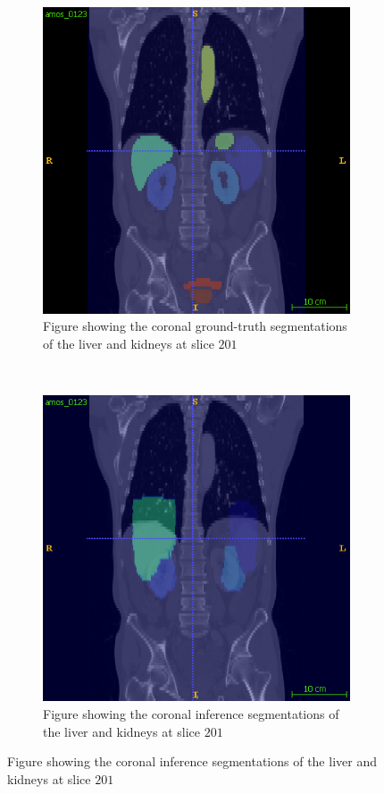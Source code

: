 \documentclass{l4proj}
\begin{document}
\begin{figure}[htb]
    \begin{subfigure}[b]{0.45\textwidth}
        \includegraphics[width=\textwidth]{images/liver_gt_2.png}
        \caption{Figure showing the coronal ground-truth segmentations of the liver and kidneys at slice $201$}
        \label{fig:full_scan_example_results_liver_gt_2}
    \end{subfigure}
    ~
    \begin{subfigure}[b]{0.45\textwidth}
        \includegraphics[width=\textwidth]{images/liver_inf_2.png}
        \caption{Figure showing the coronal inference segmentations of the liver and kidneys at slice $201$}
        \label{fig:full_scan_example_results_liver_inf_2}
    \end{subfigure}


\end{figure}
\end{document}
